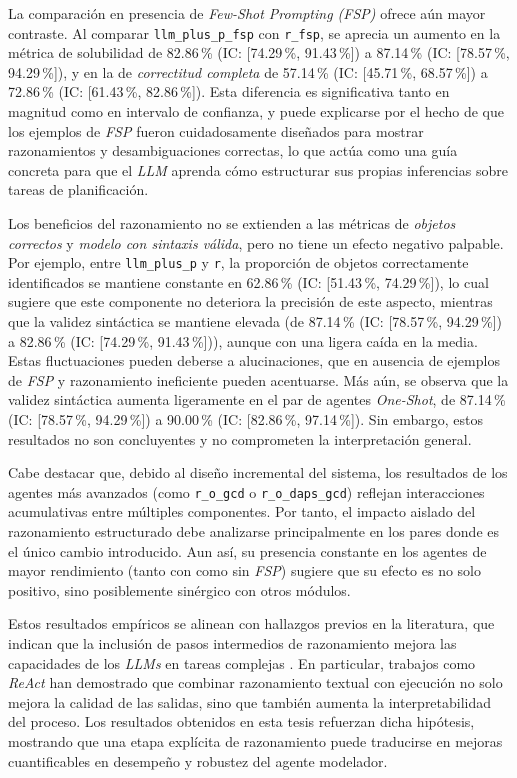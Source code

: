 La comparación en presencia de \textit{Few-Shot Prompting (FSP)} ofrece aún mayor contraste. Al comparar \texttt{llm\_plus\_p\_fsp} con \texttt{r\_fsp}, se aprecia un aumento en la métrica de solubilidad de 82.86\,\% (IC: [74.29\,\%, 91.43\,\%]) a 87.14\,\% (IC: [78.57\,\%, 94.29\,\%]), y en la de \textit{correctitud completa} de 57.14\,\% (IC: [45.71\,\%, 68.57\,\%]) a 72.86\,\% (IC: [61.43\,\%, 82.86\,\%]). Esta diferencia es significativa tanto en magnitud como en intervalo de confianza, y puede explicarse por el hecho de que los ejemplos de \textit{FSP} fueron cuidadosamente diseñados para mostrar razonamientos y desambiguaciones correctas, lo que actúa como una guía concreta para que el \textit{LLM} aprenda cómo estructurar sus propias inferencias sobre tareas de planificación.

Los beneficios del razonamiento no se extienden a las métricas de \textit{objetos correctos} y \textit{modelo con sintaxis válida}, pero no tiene un efecto negativo palpable. Por ejemplo, entre \texttt{llm\_plus\_p} y \texttt{r}, la proporción de objetos correctamente identificados se mantiene constante en 62.86\,\% (IC: [51.43\,\%, 74.29\,\%]), lo cual sugiere que este componente no deteriora la precisión de este aspecto, mientras que la validez sintáctica se mantiene elevada (de 87.14\,\% (IC: [78.57\,\%, 94.29\,\%]) a 82.86\,\% (IC: [74.29\,\%, 91.43\,\%])), aunque con una ligera caída en la media. Estas fluctuaciones pueden deberse a alucinaciones, que en ausencia de ejemplos de \textit{FSP} y razonamiento ineficiente pueden acentuarse. Más aún, se observa que la validez sintáctica aumenta ligeramente en el par de agentes \textit{One-Shot}, de 87.14\,\% (IC: [78.57\,\%, 94.29\,\%]) a 90.00\,\% (IC: [82.86\,\%, 97.14\,\%]). Sin embargo, estos resultados no son concluyentes y no comprometen la interpretación general.

Cabe destacar que, debido al diseño incremental del sistema, los resultados de los agentes más avanzados (como \texttt{r\_o\_gcd} o \texttt{r\_o\_daps\_gcd}) reflejan interacciones acumulativas entre múltiples componentes. Por tanto, el impacto aislado del razonamiento estructurado debe analizarse principalmente en los pares donde es el único cambio introducido. Aun así, su presencia constante en los agentes de mayor rendimiento (tanto con como sin \textit{FSP}) sugiere que su efecto es no solo positivo, sino posiblemente sinérgico con otros módulos.

Estos resultados empíricos se alinean con hallazgos previos en la literatura, que indican que la inclusión de pasos intermedios de razonamiento mejora las capacidades de los \textit{LLMs} en tareas complejas \parencite{wei2022chain, yao2023tree}. En particular, trabajos como \textit{ReAct} \parencite{yao2023react} han demostrado que combinar razonamiento textual con ejecución no solo mejora la calidad de las salidas, sino que también aumenta la interpretabilidad del proceso. Los resultados obtenidos en esta tesis refuerzan dicha hipótesis, mostrando que una etapa explícita de razonamiento puede traducirse en mejoras cuantificables en desempeño y robustez del agente modelador.

